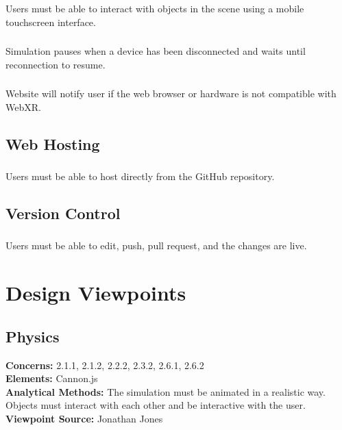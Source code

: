 \documentclass[onecolumn, draftclsnofoot,10pt, compsoc]{IEEEtran}
\begin{document}
\subsubsection{}
Users must be able to interact with objects in the scene using a mobile touchscreen interface.
\subsubsection{}
Simulation pauses when a device has been disconnected and waits until reconnection to resume.
\subsubsection{}
Website will notify user if the web browser or hardware is not compatible with WebXR.

\subsection{Web Hosting}
\subsubsection{}
Users must be able to host directly from the GitHub repository.
\subsubsection{}

\subsection{Version Control}
\subsubsection{}
Users must be able to edit, push, pull request, and the changes are live. 

\section{Design Viewpoints}

\subsection{Physics}
\textbf{Concerns:}  2.1.1, 2.1.2, 2.2.2, 2.3.2, 2.6.1, 2.6.2\\
\textbf{Elements:} Cannon.js\\
\textbf{Analytical Methods:} The simulation must be animated in a realistic way. Objects must interact with each other and be interactive with the user.\\
\textbf{Viewpoint Source:} Jonathan Jones
\end{document}
